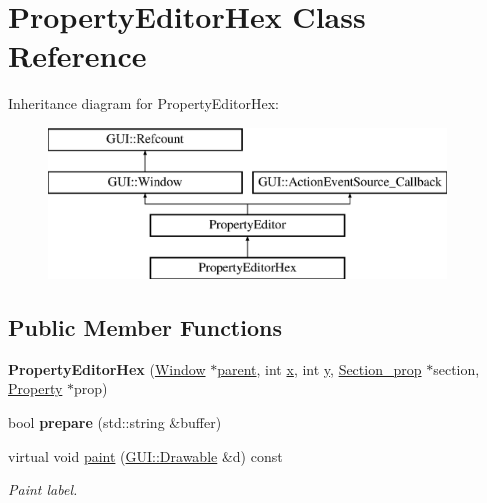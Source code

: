 \hypertarget{classPropertyEditorHex}{\section{Property\-Editor\-Hex Class Reference}
\label{classPropertyEditorHex}
}
Inheritance diagram for Property\-Editor\-Hex\-:\begin{figure}[H]
\begin{center}
\leavevmode
\includegraphics[height=4.000000cm]{classPropertyEditorHex}
\end{center}
\end{figure}
\subsection*{Public Member Functions}
\begin{DoxyCompactItemize}
\item 
\hypertarget{classPropertyEditorHex_a7a21b5b6314a5dcdc29d255ff231e84c}{{\bfseries Property\-Editor\-Hex} (\hyperlink{classGUI_1_1Window_ae828e9daa964dfc65a3550fb03117d30}{Window} $\ast$\hyperlink{classGUI_1_1Window_a2e593ff65e7702178d82fe9010a0b539}{parent}, int \hyperlink{classGUI_1_1Window_a6ca6a80ca00c9e1d8ceea8d3d99a657d}{x}, int \hyperlink{classGUI_1_1Window_a0ee8e923aff2c3661fc2e17656d37adf}{y}, \hyperlink{classSection__prop}{Section\-\_\-prop} $\ast$section, \hyperlink{classProperty}{Property} $\ast$prop)}\label{classPropertyEditorHex_a7a21b5b6314a5dcdc29d255ff231e84c}

\item 
\hypertarget{classPropertyEditorHex_aae67d8ec3c95b536a6fc01c40e5541e9}{bool {\bfseries prepare} (std\-::string \&buffer)}\label{classPropertyEditorHex_aae67d8ec3c95b536a6fc01c40e5541e9}

\item 
\hypertarget{classPropertyEditorHex_ad98a6c1d38d38da2347b75e05121d6e2}{virtual void \hyperlink{classPropertyEditorHex_ad98a6c1d38d38da2347b75e05121d6e2}{paint} (\hyperlink{classGUI_1_1Drawable}{G\-U\-I\-::\-Drawable} \&d) const }\label{classPropertyEditorHex_ad98a6c1d38d38da2347b75e05121d6e2}

\begin{DoxyCompactList}\small\item\em Paint label. \end{DoxyCompactList}\end{DoxyCompactItemize}
